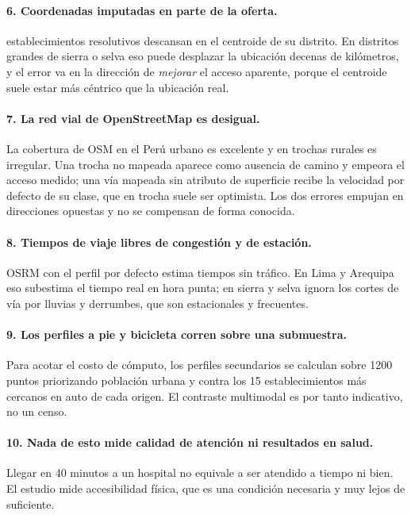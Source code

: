 \documentclass[10pt,a4paper]{article}
\begin{document}
\paragraph{6. Coordenadas imputadas en parte de la oferta.}
\kpiQFacilitiesResolutiveOnRecoveredCoords{} establecimientos resolutivos
descansan en el centroide de su distrito. En distritos grandes de sierra o selva
eso puede desplazar la ubicación decenas de kilómetros, y el error va en la
dirección de \emph{mejorar} el acceso aparente, porque el centroide suele estar
más céntrico que la ubicación real.

\paragraph{7. La red vial de OpenStreetMap es desigual.}
La cobertura de OSM en el Perú urbano es excelente y en trochas rurales es
irregular. Una trocha no mapeada aparece como ausencia de camino y empeora el
acceso medido; una vía mapeada sin atributo de superficie recibe la velocidad por
defecto de su clase, que en trocha suele ser optimista. Los dos errores empujan
en direcciones opuestas y no se compensan de forma conocida.

\paragraph{8. Tiempos de viaje libres de congestión y de estación.}
OSRM con el perfil por defecto estima tiempos sin tráfico. En Lima y Arequipa
eso subestima el tiempo real en hora punta; en sierra y selva ignora los cortes
de vía por lluvias y derrumbes, que son estacionales y frecuentes.

\paragraph{9. Los perfiles a pie y bicicleta corren sobre una submuestra.}
Para acotar el costo de cómputo, los perfiles secundarios se calculan sobre
\num{1200} puntos priorizando población urbana y contra los \num{15}
establecimientos más cercanos en auto de cada origen. El contraste multimodal es
por tanto indicativo, no un censo.

\paragraph{10. Nada de esto mide calidad de atención ni resultados en salud.}
Llegar en \num{40} minutos a un hospital no equivale a ser atendido a tiempo ni
bien. El estudio mide accesibilidad física, que es una condición necesaria y muy
lejos de suficiente.
\end{document}

